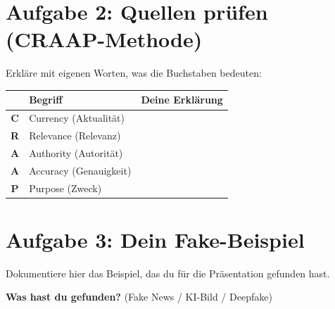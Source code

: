 \documentclass[a4paper,11pt]{article}
\begin{document}
\vspace{5mm}


\section*{Aufgabe 2: Quellen prüfen (CRAAP-Methode)}

Erkläre mit eigenen Worten, was die Buchstaben bedeuten:

\vspace{2mm}

\begin{tabularx}{\textwidth}{|c|l|X|}
\hline
& \textbf{Begriff} & \textbf{Deine Erklärung} \\
\hline
\textbf{C} & Currency (Aktualität) & \vspace{6mm} \\
\hline
\textbf{R} & Relevance (Relevanz) & \vspace{6mm} \\
\hline
\textbf{A} & Authority (Autorität) & \vspace{6mm} \\
\hline
\textbf{A} & Accuracy (Genauigkeit) & \vspace{6mm} \\
\hline
\textbf{P} & Purpose (Zweck) & \vspace{6mm} \\
\hline
\end{tabularx}

\vspace{5mm}


\section*{Aufgabe 3: Dein Fake-Beispiel}

Dokumentiere hier das Beispiel, das du für die Präsentation gefunden hast.

\vspace{3mm}

\textbf{Was hast du gefunden?} (Fake News / KI-Bild / Deepfake)
\end{document}
